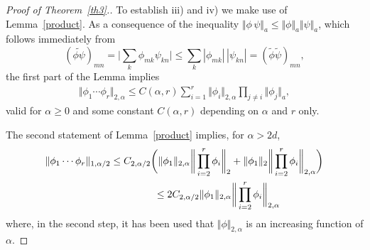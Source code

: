 \begin{proof}[Proof of Theorem~\ref{th3}.]
To establish iii) and iv) we make use of Lemma~\ref{product}. As a
consequence of the inequality
$\Vert\phi\,\psi\Vert_a\leq\Vert\phi\Vert_a \Vert\psi\Vert_a$, which
follows immediately from
\[
(\widetilde{\phi\psi})_{mn} = \bigg|\sum_k\phi_{mk} \psi_{kn}\bigg| \leq \sum_k|\phi_{mk}|\,|\psi_{kn}| = (\widetilde\phi \widetilde\psi)_{mn} ,
\]
the f\/irst part of the Lemma implies
\begin{gather}
\label{prodnorm1}
\Vert\phi_1\cdots\phi_r\Vert_{2,\alpha}\leq
C(\alpha,r)  \sum_{i=1}^r\Vert\phi_i\Vert_{2,\alpha} \prod_{j\ne i}\Vert\phi_j\Vert_a ,
\end{gather}
valid for $\alpha\geq 0$ and some constant $C(\alpha,r)$ depending
on $\alpha$ and $r$ only.

The second statement of Lemma~\ref{product} implies, for $\alpha>2d$,
\begin{gather*}%
\Vert\phi_1\cdots\phi_r\Vert_{1,\alpha/2} \leq
C_{2,\alpha/2} \bigg(\Vert\phi_1\Vert_{2,\alpha} \bigg\Vert\prod_{i=2}^r\phi_i\bigg\Vert_2 +
 \Vert\phi_1\Vert_2 \bigg\Vert\prod_{i=2}^r\phi_i\bigg\Vert_{2,\alpha}\bigg)\\
 \hphantom{\Vert\phi_1\cdots\phi_r\Vert_{1,\alpha/2}}{}
 \leq
2C_{2,\alpha/2} \Vert\phi_1\Vert_{2,\alpha} \bigg\Vert\prod_{i=2}^r\phi_i\bigg\Vert_{2,\alpha}
\end{gather*}
 where, in the second step, it has been used that $\Vert\phi\Vert_{2,\alpha}$ is an
increasing function of $\alpha$.


\end{proof}
